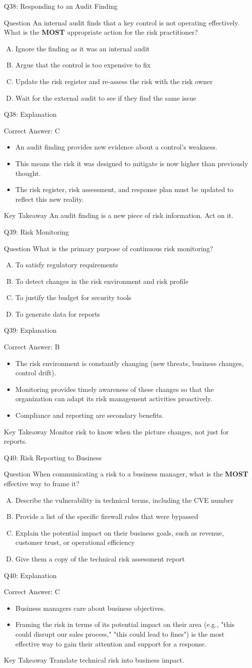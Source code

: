 \documentclass[aspectratio=169]{beamer}
\newcommand{\hq}[7]{%
	\begin{frame}{Q#1: #2}
		\begin{block}{Question}
			#3
		\end{block}
		\begin{enumerate}[(A)]
			#4
		\end{enumerate}
	\end{frame}
	\begin{frame}{Q#1: Explanation}
		\begin{block}{Correct Answer: #5}
			\begin{itemize}
				#6
			\end{itemize}
		\end{block}
		\begin{alertblock}{Key Takeaway}
			#7
		\end{alertblock}
	\end{frame}
}
\begin{document}
	\hq{38}{Responding to an Audit Finding}
	{An internal audit finds that a key control is not operating effectively. What is the \textbf{MOST} appropriate action for the risk practitioner?}
	{\item Ignore the finding as it was an internal audit
		\item Argue that the control is too expensive to fix
		\item Update the risk register and re-assess the risk with the risk owner
		\item Wait for the external audit to see if they find the same issue}
	{C}
	{\item An audit finding provides new evidence about a control's weakness.
		\item This means the risk it was designed to mitigate is now higher than previously thought.
		\item The risk register, risk assessment, and response plan must be updated to reflect this new reality.}
	{An audit finding is a new piece of risk information. Act on it.}
	
	\hq{39}{Risk Monitoring}
	{What is the primary purpose of continuous risk monitoring?}
	{\item To satisfy regulatory requirements
		\item To detect changes in the risk environment and risk profile
		\item To justify the budget for security tools
		\item To generate data for reports}
	{B}
	{\item The risk environment is constantly changing (new threats, business changes, control drift).
		\item Monitoring provides timely awareness of these changes so that the organization can adapt its risk management activities proactively.
		\item Compliance and reporting are secondary benefits.}
	{Monitor risk to know when the picture changes, not just for reports.}
	
	\hq{40}{Risk Reporting to Business}
	{When communicating a risk to a business manager, what is the \textbf{MOST} effective way to frame it?}
	{\item Describe the vulnerability in technical terms, including the CVE number
		\item Provide a list of the specific firewall rules that were bypassed
		\item Explain the potential impact on their business goals, such as revenue, customer trust, or operational efficiency
		\item Give them a copy of the technical risk assessment report}
	{C}
	{\item Business managers care about business objectives.
		\item Framing the risk in terms of its potential impact on their area (e.g., "this could disrupt our sales process," "this could lead to fines") is the most effective way to gain their attention and support for a response.}
	{Translate technical risk into business impact.}
	
\end{document}
